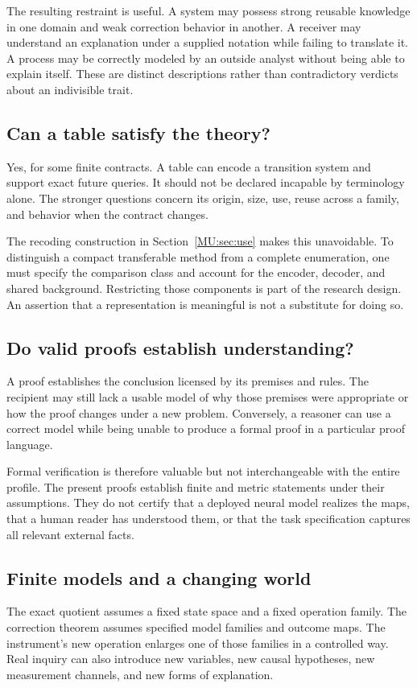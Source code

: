 The resulting restraint is useful. A system may possess strong reusable knowledge in one domain and weak correction behavior in another. A receiver may understand an explanation under a supplied notation while failing to translate it. A process may be correctly modeled by an outside analyst without being able to explain itself. These are distinct descriptions rather than contradictory verdicts about an indivisible trait.

\subsection{Can a table satisfy the theory?}
Yes, for some finite contracts. A table can encode a transition system and support exact future queries. It should not be declared incapable by terminology alone. The stronger questions concern its origin, size, use, reuse across a family, and behavior when the contract changes.

The recoding construction in Section~\ref{MU:sec:use} makes this unavoidable. To distinguish a compact transferable method from a complete enumeration, one must specify the comparison class and account for the encoder, decoder, and shared background. Restricting those components is part of the research design. An assertion that a representation is meaningful is not a substitute for doing so.

\subsection{Do valid proofs establish understanding?}
A proof establishes the conclusion licensed by its premises and rules. The recipient may still lack a usable model of why those premises were appropriate or how the proof changes under a new problem. Conversely, a reasoner can use a correct model while being unable to produce a formal proof in a particular proof language.

Formal verification is therefore valuable but not interchangeable with the entire profile. The present proofs establish finite and metric statements under their assumptions. They do not certify that a deployed neural model realizes the maps, that a human reader has understood them, or that the task specification captures all relevant external facts.

\subsection{Finite models and a changing world}
The exact quotient assumes a fixed state space and a fixed operation family. The correction theorem assumes specified model families and outcome maps. The instrument's new operation enlarges one of those families in a controlled way. Real inquiry can also introduce new variables, new causal hypotheses, new measurement channels, and new forms of explanation.

